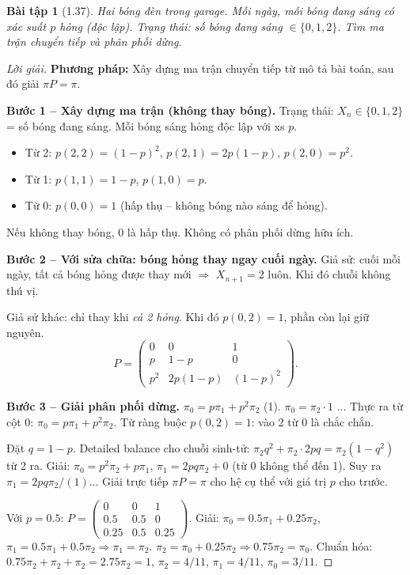 \documentclass[8pt,a4paper]{article}
\newtheorem{exercise}{Bài tập}
\newenvironment{solution}{\begin{proof}[Lời giải]}{\end{proof}}
\begin{document}
\begin{exercise}[1.37]
Hai bóng đèn trong garage. Mỗi ngày, mỗi bóng đang sáng có xác suất $p$ hỏng (độc lập). Trạng thái: số bóng đang sáng $\in \{0,1,2\}$. Tìm ma trận chuyển tiếp và phân phối dừng.
\end{exercise}
\begin{solution}
\textbf{Phương pháp:} Xây dựng ma trận chuyển tiếp từ mô tả bài toán, sau đó giải $\pi P = \pi$.

\textbf{Bước 1 -- Xây dựng ma trận (không thay bóng).}
Trạng thái: $X_n \in \{0, 1, 2\}$ = số bóng đang sáng. Mỗi bóng sáng hỏng độc lập với xs $p$.
\begin{itemize}
  \item Từ 2: $p(2,2) = (1-p)^2$, $p(2,1) = 2p(1-p)$, $p(2,0) = p^2$.
  \item Từ 1: $p(1,1) = 1-p$, $p(1,0) = p$.
  \item Từ 0: $p(0,0) = 1$ (hấp thụ -- không bóng nào sáng để hỏng).
\end{itemize}
Nếu không thay bóng, 0 là hấp thụ. Không có phân phối dừng hữu ích.

\textbf{Bước 2 -- Với sửa chữa: bóng hỏng thay ngay cuối ngày.}
Giả sử: cuối mỗi ngày, tất cả bóng hỏng được thay mới $\Rightarrow$ $X_{n+1} = 2$ luôn. Khi đó chuỗi không thú vị.

Giả sử khác: chỉ thay khi \emph{cả 2 hỏng}. Khi đó $p(0,2)=1$, phần còn lại giữ nguyên.
\[
  P = \begin{pmatrix} 0 & 0 & 1 \\ p & 1-p & 0 \\ p^2 & 2p(1-p) & (1-p)^2 \end{pmatrix}.
\]

\textbf{Bước 3 -- Giải phân phối dừng.}
$\pi_0 = p\pi_1 + p^2\pi_2$ (1). $\pi_0 = \pi_2 \cdot 1$ ... Thực ra từ cột 0: $\pi_0 = p\pi_1 + p^2\pi_2$. Từ ràng buộc $p(0,2)=1$: vào 2 từ 0 là chắc chắn.

Đặt $q = 1-p$. Detailed balance cho chuỗi sinh-tử: $\pi_2 q^2 + \pi_2 \cdot 2pq = \pi_2(1-q^2)$ từ 2 ra. Giải: $\pi_0 = p^2\pi_2 + p\pi_1$, $\pi_1 = 2pq\pi_2 + 0$ (từ 0 không thể đến 1). Suy ra $\pi_1 = 2pq\pi_2/(1)$... Giải trực tiếp $\pi P = \pi$ cho hệ cụ thể với giá trị $p$ cho trước.

Với $p = 0.5$: $P = \begin{pmatrix} 0 & 0 & 1 \\ 0.5 & 0.5 & 0 \\ 0.25 & 0.5 & 0.25 \end{pmatrix}$. Giải: $\pi_0 = 0.5\pi_1 + 0.25\pi_2$, $\pi_1 = 0.5\pi_1 + 0.5\pi_2 \Rightarrow \pi_1 = \pi_2$. $\pi_2 = \pi_0 + 0.25\pi_2 \Rightarrow 0.75\pi_2 = \pi_0$. Chuẩn hóa: $0.75\pi_2 + \pi_2 + \pi_2 = 2.75\pi_2 = 1$, $\pi_2 = 4/11$, $\pi_1 = 4/11$, $\pi_0 = 3/11$.
\end{solution}
\end{document}
